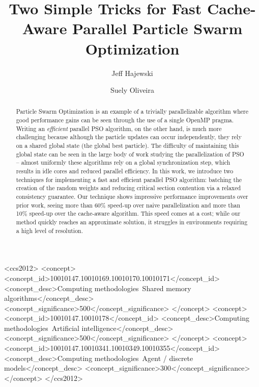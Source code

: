\documentclass[sigconf]{acmart}
\begin{document}
\title[Two Simple Tricks for Fast Cache-Aware Parallel PSO]{Two Simple Tricks for Fast Cache-Aware Parallel Particle Swarm Optimization}
\author{Jeff Hajewski}

\author{Suely Oliveira}

\renewcommand{\shortauthors}{J. Hajewski et al.}


\begin{abstract}
Particle Swarm Optimization is an example of a trivially parallelizable
algorithm where good performance gains can be seen through the use of a single
OpenMP pragma. Writing an \emph{efficient} parallel PSO algorithm, on the other hand, is much more
challenging because although the particle updates can occur independently, they
rely on a shared global state (the global best particle). The difficulty of
maintaining this global state can be seen in the large body of work studying the
parallelization of PSO -- almost uniformly these algorithms rely on a global
synchronization step, which results in idle cores and reduced parallel
efficiency. In this work, we introduce two techniques for implementing a fast and
efficient parallel PSO algorithm: batching the creation of the random weights
and reducing critical section contention via a relaxed consistency guarantee.
Our technique shows impressive performance improvements over prior work, seeing
more than 60\% speed-up over naive parallelization and more than 10\% speed-up
over the cache-aware algorithm. This speed comes at a cost; while our method
quickly reaches an approximate solution, it struggles in environments requiring
a high level of resolution.
\end{abstract}

%
%
\begin{CCSXML}
<ccs2012>
<concept>
<concept_id>10010147.10010169.10010170.10010171</concept_id>
<concept_desc>Computing methodologies~Shared memory algorithms</concept_desc>
<concept_significance>500</concept_significance>
</concept>
<concept>
<concept_id>10010147.10010178</concept_id>
<concept_desc>Computing methodologies~Artificial intelligence</concept_desc>
<concept_significance>500</concept_significance>
</concept>
<concept>
<concept_id>10010147.10010341.10010349.10010355</concept_id>
<concept_desc>Computing methodologies~Agent / discrete models</concept_desc>
<concept_significance>300</concept_significance>
</concept>
</ccs2012>
\end{CCSXML}
\end{document}

